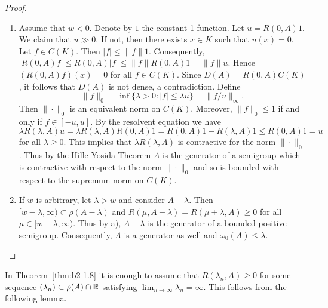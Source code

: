 \begin{proof} 
\begin{enumerate}[\upshape (i), wide, labelindent=.5em]
\item \label{thm:b2-1.8-1}
Assume that $w < 0$.
Denote by $1$ the constant-1-function.
Let $u = R(0,A)1$.
We claim that $u \gg 0$.
If not, then there exists $x \in K$ such that $u(x) = 0$.
Let $f \in C(K)$.
Then $|f| \leq \|f\|1$.
Consequently, $|R(0,A)f| \leq R(0,A)|f| \leq \|f\|R(0,A)1 = \|f\|u$.
Hence $(R(0,A)f)(x) = 0$ for all $f \in C(K)$.
Since $D(A) = R(0,A)C(K)$, it follows that $D(A)$ is not dense, a contradiction.
Define 
\[\|f\|_{0} = \inf \{\lambda > 0 \colon |f| \leq \lambda u\} = \|f/u\|_{\infty}.
\]
Then $\|\cdot\|_{0}$ is an equivalent norm on $C(K)$.
Moreover, $\|f\|_{0} \leq 1$ if and only if $f \in [-u,u]$.
By the resolvent equation we have 
\[
\lambda R(\lambda,A)u = \lambda R(\lambda,A)R(0,A)1 = R(0,A)1 - R(\lambda,A)1 \leq R(0,A)1 = u 
\]
for all $\lambda \geq 0$.
This implies that $\lambda R(\lambda,A)$ is contractive for the norm $\|\cdot\|_{0}$.
Thus by the Hille-Yosida Theorem $A$ is the generator of a semigroup which is contractive with respect to the norm $\|\cdot\|_{0}$ and so is bounded with respect to the supremum norm on $C(K)$.

\item \label{thm:b2-1.8-2}
If $w$ is arbitrary, let $\lambda > w$ and consider $A - \lambda$.
Then $[w-\lambda,\infty) \subset \rho(A-\lambda)$ and $R(\mu,A-\lambda) = R(\mu+\lambda,A) \geq 0$ for all $\mu \in [w-\lambda,\infty)$.
Thus by a), $A - \lambda$ is the generator of a bounded positive semigroup.
Consequently, $A$ is a generator as well and $\omega_{0}(A) \leq \lambda$.
\end{enumerate}
\end{proof}
In Theorem~\ref{thm:b2-1.8} it is enough to assume that $R(\lambda_{n},A) \geq 0$ for some sequence 
 $(\lambda_{n}) \subset \rho(A) \cap \mathbb{R}$ satisfying $\lim_{n \to \infty} \lambda_{n} = \infty$.
This follows from the following lemma.

